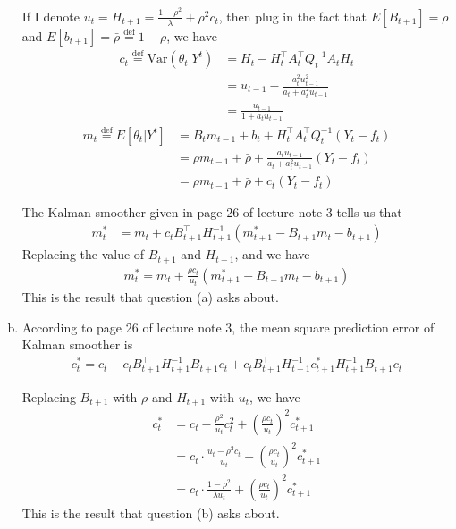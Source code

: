 \documentclass[12pt]{article}
\begin{document}
\begin{enumerate}[(a)]
If I denote $u_{t} = H_{t+1} = \frac{1-\rho^2}{\lambda}+\rho^2 c_{t}$, then plug in the fact that $E[B_{t+1}] = \rho$ and $E[b_{t+1}] = \bar{\rho} \stackrel{\text{def}}{=} 1-\rho$, we have
\begin{align}
	c_{t} \stackrel{\text{def}}{=} \text{Var}\left(\left. \theta_{t} \right\vert Y^{t} \right) &= H_t - H_t^{\top} A_{t}^{\top} Q_{t}^{-1} A_{t} H_t \nonumber\\
	&= u_{t-1} - \frac{a_{t}^2 u_{t-1}^2}{a_{t} + a_{t}^2 u_{t-1}} \nonumber\\
	&=\frac{u_{t-1}}{1+a_{t}u_{t-1}}
\end{align}
\begin{align}
	m_{t} \stackrel{\text{def}}{=} E\left[ \left. \theta_{t} \right\vert Y^{t} \right] &= B_{t}m_{t-1}+b_{t}+H_{t}^{\top}A_{t}^{\top}Q_{t}^{-1}(Y_{t}-f_{t})\nonumber \\
	&= \rho m_{t-1} + \bar{\rho} + \frac{a_{t}u_{t-1}}{a_{t}+a_{t}^2 u_{t-1}} (Y_{t} - f_{t})\nonumber \\
	&= \rho m_{t-1} + \bar{\rho}  + c_{t}(Y_{t} - f_{t})
\end{align}

The Kalman smoother given in page 26 of lecture note 3 tells us that 
\begin{align}
	m_{t}^{*} &= m_{t} + c_{t}B_{t+1}^{\top} H_{t+1}^{-1}(m_{t+1}^{*} - B_{t+1}m_{t} - b_{t+1}) 
\end{align}
Replacing the value of $B_{t+1}$ and $H_{t+1}$, and we have
\begin{align}
	m_{t}^{*}= m_{t} + \frac{\rho c_{t}}{u_{t}}(m_{t+1}^{*} - B_{t+1}m_{t} - b_{t+1})
\end{align}
This is the result that question (a) asks about.

\item According to page 26 of lecture note 3, the mean square prediction error of Kalman smoother is
\begin{align}
	c_{t}^{*} = c_{t} - c_{t}B_{t+1}^{\top} H_{t+1}^{-1} B_{t+1} c_{t} + c_{t}B_{t+1}^{\top} H_{t+1}^{-1} c_{t+1}^{*} H_{t+1}^{-1} B_{t+1} c_{t}
\end{align}

Replacing $B_{t+1}$ with $\rho$ and $H_{t+1}$ with $u_{t}$, we have
\begin{align}
	c_{t}^{*} &= c_{t} - \frac{\rho^2}{u_{t}}c_{t}^2 + \left( \frac{\rho c_{t}}{u_{t}} \right)^2 c_{t+1}^{*}\nonumber \\
	&= c_{t}\cdot \frac{u_{t} - \rho^2 c_{t}}{u_{t}} + \left( \frac{\rho c_{t}}{u_{t}} \right)^2 c_{t+1}^{*}\nonumber \\
	&= c_{t}\cdot \frac{1-\rho^2}{\lambda u_{t}} + \left( \frac{\rho c_{t}}{u_{t}} \right)^2 c_{t+1}^{*}
\end{align}
This is the result that question (b) asks about.

\end{enumerate}
\end{document}

